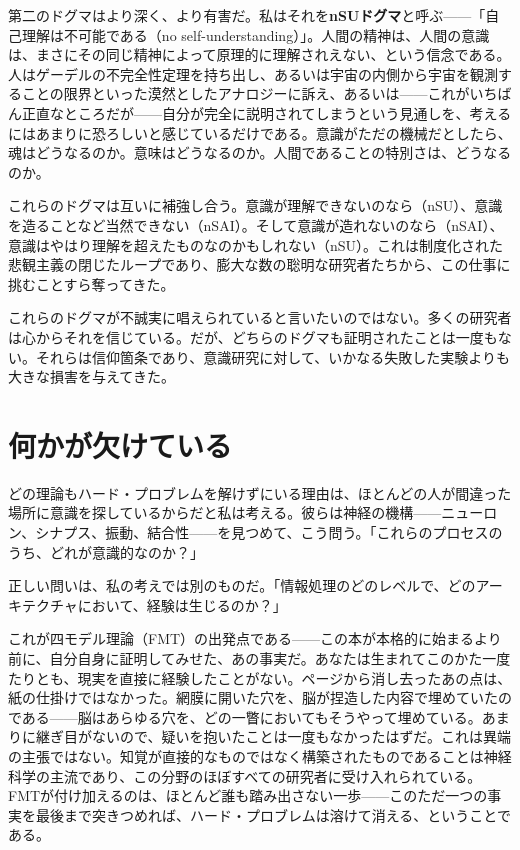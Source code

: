 \documentclass[11pt, twoside, openright]{book}
\begin{document}
第二のドグマはより深く、より有害だ。私はそれを\textbf{nSUドグマ}と呼ぶ------「自己理解は不可能である（no self-understanding）」。人間の精神は、人間の意識は、まさにその同じ精神によって原理的に理解されえない、という信念である。人はゲーデルの不完全性定理を持ち出し、あるいは宇宙の内側から宇宙を観測することの限界といった漠然としたアナロジーに訴え、あるいは------これがいちばん正直なところだが------自分が完全に説明されてしまうという見通しを、考えるにはあまりに恐ろしいと感じているだけである。意識がただの機械だとしたら、魂はどうなるのか。意味はどうなるのか。人間であることの特別さは、どうなるのか。

これらのドグマは互いに補強し合う。意識が理解できないのなら（nSU）、意識を造ることなど当然できない（nSAI）。そして意識が造れないのなら（nSAI）、意識はやはり理解を超えたものなのかもしれない（nSU）。これは制度化された悲観主義の閉じたループであり、膨大な数の聡明な研究者たちから、この仕事に挑むことすら奪ってきた。

これらのドグマが不誠実に唱えられていると言いたいのではない。多くの研究者は心からそれを信じている。だが、どちらのドグマも証明されたことは一度もない。それらは信仰箇条であり、意識研究に対して、いかなる失敗した実験よりも大きな損害を与えてきた。

\section*{何かが欠けている}

どの理論もハード・プロブレムを解けずにいる理由は、ほとんどの人が間違った場所に意識を探しているからだと私は考える。彼らは神経の機構------ニューロン、シナプス、振動、結合性------を見つめて、こう問う。「これらのプロセスのうち、どれが意識的なのか？」

正しい問いは、私の考えでは別のものだ。「情報処理のどのレベルで、どのアーキテクチャにおいて、経験は生じるのか？」

これが四モデル理論（FMT）の出発点である------この本が本格的に始まるより前に、自分自身に証明してみせた、あの事実だ。あなたは生まれてこのかた一度たりとも、現実を直接に経験したことがない。ページから消し去ったあの点は、紙の仕掛けではなかった。網膜に開いた穴を、脳が捏造した内容で埋めていたのである------脳はあらゆる穴を、どの一瞥においてもそうやって埋めている。あまりに継ぎ目がないので、疑いを抱いたことは一度もなかったはずだ。これは異端の主張ではない。知覚が直接的なものではなく構築されたものであることは神経科学の主流であり、この分野のほぼすべての研究者に受け入れられている。FMTが付け加えるのは、ほとんど誰も踏み出さない一歩------このただ一つの事実を最後まで突きつめれば、ハード・プロブレムは溶けて消える、ということである。
\end{document}
